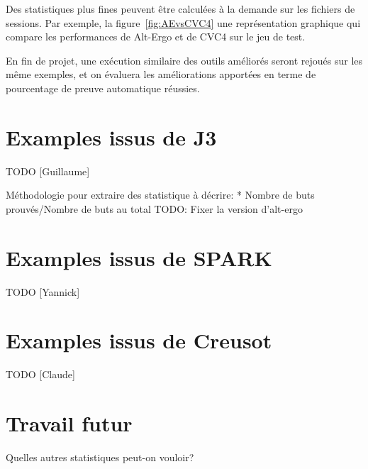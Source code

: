 \documentclass[a4paper,11pt]{article}
\begin{document}
Des statistiques plus fines peuvent être calculées à la demande sur
les fichiers de sessions. Par exemple, la figure~\ref{fig:AEvsCVC4}
une représentation graphique qui compare les performances de Alt-Ergo
et de CVC4 sur le jeu de test.

En fin de projet, une exécution similaire des outils améliorés seront
rejoués sur les même exemples, et on évaluera les améliorations
apportées en terme de pourcentage de preuve automatique réussies.


\section{Examples issus de J3}

TODO [Guillaume]

Méthodologie pour extraire des statistique à décrire:
* Nombre de buts prouvés/Nombre de buts au total
TODO: Fixer la version d'alt-ergo

\section{Examples issus de SPARK}

TODO [Yannick]

\section{Examples issus de Creusot}

TODO [Claude]

\section{Travail futur}

Quelles autres statistiques peut-on vouloir?
\end{document}
